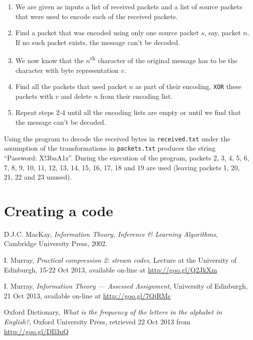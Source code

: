 \documentclass[10pt,a4paper,oneside,onecolumn]{article}
\newcommand*{\receivedTXT}{{\tt received.txt}\xspace}
\newcommand*{\packetsTXT}{{\tt packets.txt}\xspace}
\newcommand*{\XOR}{{\tt XOR}\xspace}
\begin{document}
\begin{enumerate}
\item We are given as inputs a list of received packets and a list of source
      packets that were used to encode each of the received packets.
\item Find a packet that was encoded using only one source packet $s$, say,
      packet $n$.  If no such packet exists, the message can't be decoded.
\item We now know that the $n$\textsuperscript{th} character of the original
      message has to be the character with byte representation $v$.
\item Find all the packets that used packet $n$ as part of their encoding.
      \XOR these packets with $v$ and delete $n$ from their encoding list.
\item Repeat steps 2-4 until all the encoding lists are empty or until we find
      that the message can't be decoded.
\end{enumerate}

Using the program to decode the received bytes in \receivedTXT under the
assumption of the transformations in \packetsTXT produces the string ``Password:
X!3baA1z''. During the execution of the program, packets 2, 3, 4, 5, 6, 7, 8, 9,
10, 11, 12, 13, 14, 15, 16, 17, 18 and 19 are used (leaving packets 1, 20, 21,
22 and 23 unused).

\section{Creating a code}\label{sec:ex8}


\begin{thebibliography}{9}

    D.J.C. MacKay,
    \emph{Information Theory, Inference \& Learning Algorithms},
    Cambridge University Press,
    2002.

    I. Murray,
    \emph{Practical compression 2: stream codes},
    Lecture at the University of Edinburgh,
    15-22 Oct 2013,
    available on-line at \url{http://goo.gl/Q2JkXm}

    I. Murray,
    \emph{Information Theory — Assessed Assignment},
    University of Edinburgh,
    21 Oct 2013,
    available on-line at \url{http://goo.gl/7QjRMc}

    Oxford Dictionary,
    \emph{What is the frequency of the letters in the alphabet in English?},
    Oxford University Press,
    retrieved 22 Oct 2013 from \url{http://goo.gl/DIl3uQ}

\end{thebibliography}
\end{document}
